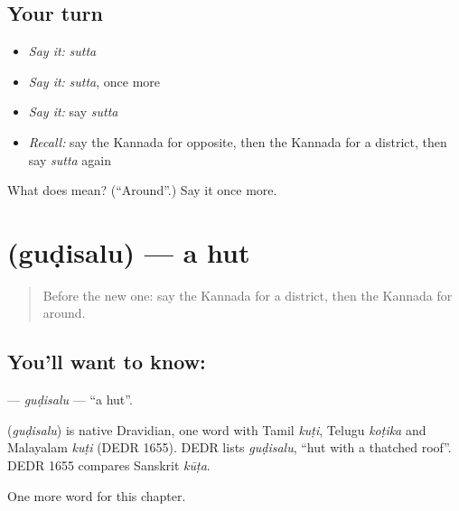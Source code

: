 \subsection*{Your turn}
\begin{itemize}
\raggedright
  \item \emph{Say it:} \emph{sutta}
  \item \emph{Say it:} \emph{sutta}, once more
  \item \emph{Say it:} say \emph{sutta}
  \item \emph{Recall:} say the Kannada for opposite, then the Kannada for a district, then say \emph{sutta} again
\end{itemize}

\begin{tcolorbox}[breakable,colback=teal!4,colframe=teal!35!black,title={Before you move on}]
What does  mean? (\textquotedblleft{}Around\textquotedblright{}.) Say it once more.
\end{tcolorbox}
\section[\texorpdfstring{\kn{ಗುಡಿಸಲು} (guḍisalu)}{ಗುಡಿಸಲು (guḍisalu)}]{ (guḍisalu) — a hut}

\label{lesson:KA-C250-gudisalu}



\begin{quote}
Before the new one: say the Kannada for a district, then the Kannada for around.
\end{quote}

\subsection*{You'll want to know: }
\textbf{} — \emph{guḍisalu} — \textquotedblleft{}a hut\textquotedblright{}.

\begin{cousinweb}
\textbf{} (\emph{guḍisalu}) is native Dravidian, one word with Tamil \emph{kuṭi}, Telugu \emph{koṭika} and Malayalam \emph{kuṭi} (DEDR 1655). DEDR lists \emph{guḍisalu}, \textquotedblleft{}hut with a thatched roof\textquotedblright{}. DEDR 1655 compares Sanskrit \emph{kūṭa}.
\end{cousinweb}

\begin{grammarlens}[title={What you've built}]
One more word for this chapter.
\end{grammarlens}

